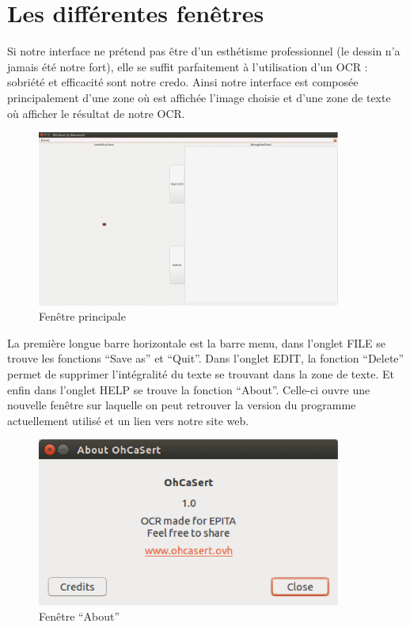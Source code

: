 \documentclass[11pt]{report}
\begin{document}
\section{Les différentes fenêtres}

Si notre interface ne prétend pas être d’un esthétisme professionnel (le dessin n’a jamais été notre fort), elle se suffit parfaitement à l’utilisation d’un OCR : sobriété et efficacité sont notre credo. Ainsi notre interface est composée principalement d’une zone où est affichée l’image choisie et d’une zone de texte où afficher le résultat de notre OCR.

\begin{figure}[htbp]
\centering
\includegraphics[width=10cm]{gui.png}
\caption{Fenêtre principale}
\end{figure}

La première longue barre horizontale est la barre menu, dans l’onglet FILE se trouve les fonctions ``Save as'' et ``Quit''. Dans l’onglet EDIT, la fonction ``Delete'' permet de supprimer l’intégralité du texte se trouvant dans la zone de texte. Et enfin dans l’onglet HELP se trouve la fonction ``About''. Celle-ci ouvre une nouvelle fenêtre sur laquelle on peut retrouver la version du programme actuellement utilisé et un lien vers notre site web.

\begin{figure}[htbp]
\centering
\includegraphics[width=10cm]{gui-about.png}
\caption{Fenêtre ``About''}
\end{figure}
\end{document}
